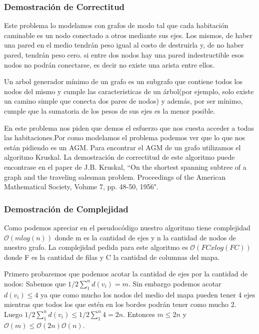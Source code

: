 \documentclass[spanish,12pt]{article}
\begin{document}
\subsubsection{Demostración de Correctitud}

Este problema lo modelamos con grafos de modo tal que cada habitación caminable es un nodo conectado a otros mediante sus ejes. Los mismos, de haber una pared en el medio tendrán peso igual al costo de destruirla y, de no haber pared, tendrán peso cero. si entre dos nodos hay una pared indestructible esos nodos no podrán conectarse, es decir no existe una arista entre ellos.

Un arbol generador mínimo de un grafo es un subgrafo que contiene todos los nodos del mismo y cumple las caracteristicas de un árbol(por ejemplo, solo existe un camino simple que conecta dos pares de nodos) y además, por ser mínimo, cumple que la sumatoria de los pesos de sus ejes es la menor posible.

En este problema nos piden que demos el esfuerzo que nos cuesta acceder a todas las habitaciones.Por como modelamos el problema podemos ver que lo que nos están pidiendo es un AGM. Para encontrar el AGM de un grafo utilizamos el algoritmo Kruskal. La demostración de correctitud de este algoritmo puede encontrase en el paper de  J.B. Kruskal, ``On the shortest spanning subtree of a graph and the traveling salesman problem. Proceedings of the American Mathematical Society, Volume 7, pp. 48-50, 1956".



\subsubsection{Demostración de Complejidad}


Como podemos apreciar en el pseudocódigo nuestro algoritmo tiene complejidad $\mathcal{O}(mlog(n))$ donde m es la cantidad de ejes y n la cantidad de nodos de nuestro grafo. 
La complejidad pedida para este algoritmo es $\mathcal{O}(FCxlog(FC))$ donde F es la cantidad de filas y C la cantidad de columnas del mapa.


Primero probaremos que podemos acotar la cantidad de ejes por la cantidad de nodos:
Sabemos que $1/2  \sum_{1}^{n}d(v_{i}) =m $. Sin embargo podemos acotar $d(v_{i}) \leq 4$ ya que como mucho los nodos del medio del mapa pueden tener 4 ejes mientras que todos los que estén en los bordes podrán tener como mucho 2. Luego $1/2  \sum_{1}^{n}{d(v_{i})} \leq 1/2 \sum_{1}^{n}{4} = 2n$. Entonces $m \leq 2n$ y $\mathcal{O}(m) \leq \mathcal{O}(2n) \mathcal{O}(n)$.
\end{document}
